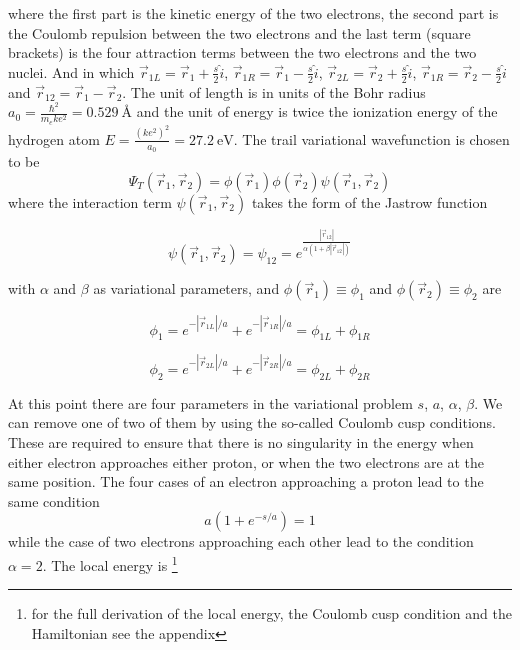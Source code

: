 \documentclass{article}
\begin{document}
where the first part is the kinetic energy of the two electrons, the second part is the Coulomb repulsion between the two electrons and the last term (square brackets) is the four attraction terms between the two electrons and the two nuclei. And in which $\vec{r}_{1L} = \vec{r}_1 + \frac{s}{2} \hat{i}$, $\vec{r}_{1R} = \vec{r}_1 - \frac{s}{2} \hat{i}$, $\vec{r}_{2L} = \vec{r}_2 + \frac{s}{2} \hat{i}$, $\vec{r}_{1R} = \vec{r}_2 - \frac{s}{2} \hat{i}$ and $\vec{r}_{12} = \vec{r}_1 -\vec{r}_2$. The unit of length is in units of the Bohr radius $a_0=\frac{\hbar^2}{m_e k e^2}=\SI{0.529}{\angstrom}$ and the unit of energy is twice the ionization energy of the hydrogen atom $E=\frac{(ke^2)^2}{a_0}=\SI{27.2}{\electronvolt}$. The trail variational wavefunction is chosen to be 
\begin{equation}
\label{wf}
 \Psi_{T}(\vec{r}_1,\vec{r}_2)=\phi(\vec{r}_1)\phi(\vec{r}_2)\psi(\vec{r}_1,\vec{r}_2)
\end{equation}
where the interaction term $\psi(\vec{r}_1,\vec{r}_2)$ takes the form of the Jastrow function

\begin{equation}
\psi(\vec{r}_1,\vec{r}_2) = \psi_{12} = e^{\frac{\left| \vec{r}_{12}  \right|}{\alpha(1+\beta |\vec{r}_{12}|)} }
\end{equation}

with $\alpha$ and $\beta$ as variational parameters, and $\phi(\vec{r}_1) \equiv \phi_1$ and $\phi(\vec{r}_2) \equiv \phi_2$ are

\begin{equation}
 \phi_1 = e^{-|\vec{r}_{1L}|/a} + e^{-|\vec{r}_{1R}|/a} = \phi_{1L} +\phi_{1R}
\end{equation}

\begin{equation}
 \phi_2 = e^{-|\vec{r}_{2L}|/a} + e^{-|\vec{r}_{2R}|/a} = \phi_{2L} +\phi_{2R}
\end{equation}

At this point there are four parameters in the variational problem $s$, $a$, $\alpha$, $\beta$. We can remove one of two of them by using the so-called Coulomb cusp conditions. These are required to ensure that there is no singularity in the energy when either electron approaches either proton, or when the two electrons are at the same position. The four cases of an electron approaching a proton lead to the same condition 
\begin{equation}
\label{cusp}
 a(1+e^{-s/a}) =1
\end{equation}
while the case of two electrons approaching each other lead to the condition $\alpha=2$. The local energy is \footnote{for the full derivation of the local energy, the Coulomb cusp condition and the Hamiltonian see the appendix}
\end{document}
